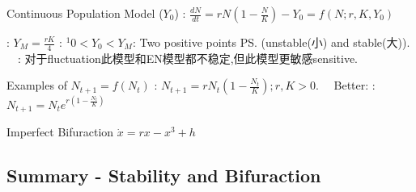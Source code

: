 \documentclass{note}
\begin{document}
\begin{MyTh}{Continuous Population Model {\scriptsize ($Y_0$)}}
    : $\frac{dN}{dt}=rN(1-\frac{N}{K})-Y_0=f(N;r,K,Y_0)$ 

    {\scriptsize \quad {}: $Y_M=\frac{rK}{4}$ \quad {}: $^1$$0<Y_0<Y_M$: Two positive points \ps{(unstable(小) and stable(大))}. \ \ : {\tiny 对于fluctuation此模型和EN模型都不稳定,但此模型更敏感sensitive.}}
\end{MyTh}

\begin{MyTh}{Examples of $N_{t+1}=f(N_t)$}
    : $N_{t+1}=rN_t(1-\frac{N_t}{K});r,K>0$. \ \ Better: : $N_{t+1}=N_t e^{r(1-\frac{N_t}{K})}$
\end{MyTh}

\begin{MyTh}{Imperfect Bifuraction}
    $\dot{x}=rx-x^3+h$  \ \ 
\end{MyTh}


\subsection{Summary - Stability and Bifuraction}
\end{document}
